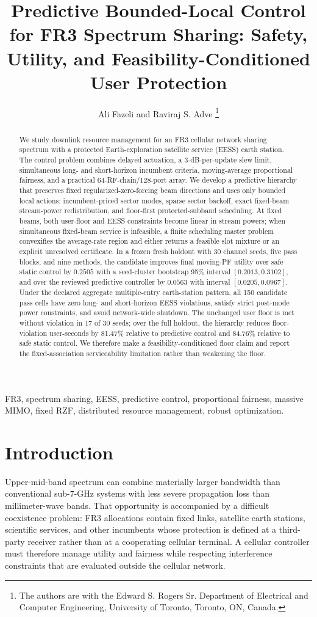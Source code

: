 \documentclass[journal]{IEEEtran}
\title{Predictive Bounded-Local Control for FR3 Spectrum Sharing: Safety, Utility, and Feasibility-Conditioned User Protection}
\author{Ali Fazeli and Raviraj S. Adve%
\thanks{The authors are with the Edward S. Rogers Sr. Department of Electrical and Computer Engineering, University of Toronto, Toronto, ON, Canada.}}
\begin{document}
\maketitle

\begin{abstract}
We study downlink resource management for an FR3 cellular network sharing spectrum with a protected Earth-exploration satellite service (EESS) earth station. The control problem combines delayed actuation, a 3-dB-per-update slew limit, simultaneous long- and short-horizon incumbent criteria, moving-average proportional fairness, and a practical 64-RF-chain/128-port array. We develop a predictive hierarchy that preserves fixed regularized-zero-forcing beam directions and uses only bounded local actions: incumbent-priced sector modes, sparse sector backoff, exact fixed-beam stream-power redistribution, and floor-first protected-subband scheduling. At fixed beams, both user-floor and EESS constraints become linear in stream powers; when simultaneous fixed-beam service is infeasible, a finite scheduling master problem convexifies the average-rate region and either returns a feasible slot mixture or an explicit unresolved certificate. In a frozen fresh holdout with 30 channel seeds, five pass blocks, and nine methods, the candidate improves final moving-PF utility over safe static control by $0.2505$ with a seed-cluster bootstrap 95\% interval $[0.2013,0.3102]$, and over the reviewed predictive controller by $0.0563$ with interval $[0.0205,0.0967]$. Under the declared aggregate multiple-entry earth-station pattern, all 150 candidate pass cells have zero long- and short-horizon EESS violations, satisfy strict post-mode power constraints, and avoid network-wide shutdown. The unchanged user floor is met without violation in 17 of 30 seeds; over the full holdout, the hierarchy reduces floor-violation user-seconds by 81.47\% relative to predictive control and 84.76\% relative to safe static control. We therefore make a feasibility-conditioned floor claim and report the fixed-association serviceability limitation rather than weakening the floor.
\end{abstract}

\begin{IEEEkeywords}
FR3, spectrum sharing, EESS, predictive control, proportional fairness, massive MIMO, fixed RZF, distributed resource management, robust optimization.
\end{IEEEkeywords}

\section{Introduction}
Upper-mid-band spectrum can combine materially larger bandwidth than conventional sub-7-GHz systems with less severe propagation loss than millimeter-wave bands. That opportunity is accompanied by a difficult coexistence problem: FR3 allocations contain fixed links, satellite earth stations, scientific services, and other incumbents whose protection is defined at a third-party receiver rather than at a cooperating cellular terminal. A cellular controller must therefore manage utility and fairness while respecting interference constraints that are evaluated outside the cellular network.
\end{document}
